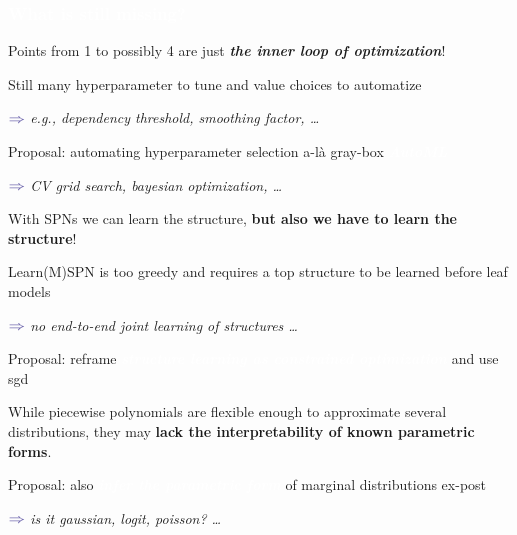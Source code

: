 \documentclass[xcolor={usenames,dvipsnames,svgnames}, compress]{beamer}
\newcommand{\highlighttext}[2][yellow]{{\colorbox{#1}{\textcolor{white}{#2}}}}
\begin{document}
\begin{frame}[t]
  \frametitle{\highlighttext[yellow4]{What is still missing?}}
  \footnotesize
  Points from 1 to possibly 4 are just \emph{\textbf{the inner loop of
    optimization}}!\par
  Still many hyperparameter to tune and value choices to
  automatize\par
  \begin{minipage}{1.0\linewidth}
  \vspace{2pt}
      \raggedleft
      $\color{violet}\boldsymbol\Rightarrow$
      \scriptsize
 \emph{e.g., dependency threshold, smoothing factor, \dots}
\end{minipage}\par
Proposal: automating hyperparameter selection a-là gray-box \highlighttext[yellow3]{\emph{\textbf{AutoML}}}\par
\begin{minipage}{1.0\linewidth}
  \vspace{2pt}
      \raggedleft
      $\color{violet}\boldsymbol\Rightarrow$
      \scriptsize
 \emph{CV grid search, bayesian optimization, \dots}
\end{minipage}\par\bigskip

With SPNs we can learn the structure, \textbf{but also we have to learn the
structure}!\par
Learn(M)SPN is too greedy and requires a top structure to be
learned before leaf models
\begin{minipage}{1.0\linewidth}
  \vspace{2pt}
      \raggedleft
      $\color{violet}\boldsymbol\Rightarrow$
      \scriptsize
 \emph{no end-to-end joint learning of structures \dots}
\end{minipage}
Proposal: reframe \highlighttext[yellow3]{\emph{\textbf{structure learning as constrained optimization}}} and
use sgd\par\bigskip


  While piecewise polynomials are flexible enough to approximate
  several distributions, they may \textbf{lack the interpretability of  known
  parametric forms}.\par
  Proposal: also \highlighttext[yellow3]{\emph{\textbf{infer the parametric form}}} of marginal
  distributions ex-post\par
  \begin{minipage}{1.0\linewidth}
  \vspace{2pt}
      \raggedleft
      $\color{violet}\boldsymbol\Rightarrow$
      \scriptsize
 \emph{is it gaussian, logit, poisson? \dots}
\end{minipage}\par\bigskip
  
\end{frame}
\end{document}
